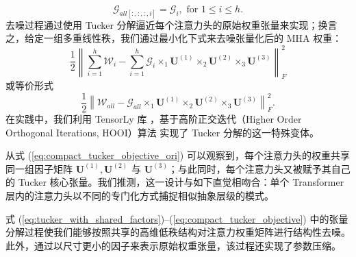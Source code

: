 \begin{equation}
    \mathcal{G}_{all [:,:,:,i]} = \mathcal{G}_i ,\text{ for  } 1\leq i \leq h.
    \label{eq:tucker_core_all}
\end{equation}
去噪过程通过使用 Tucker 分解逼近每个注意力头的原始权重张量来实现；换言之，给定一组多重线性秩，我们通过最小化下式来去噪张量化后的 MHA 权重：
\begin{equation}
\frac{1}{2} \left\| \sum_{i=1}^h \mathcal{W}_i - \sum_{i=1}^h \mathcal{G}_i \times_1 \mathbf{U}^{(1)} \times_2 \mathbf{U}^{(2)} \times_3 \mathbf{U}^{(3)} \right\|^2_F
\label{eq:compact_tucker_objective_ori}
\end{equation}
或等价形式
\begin{equation}
\frac{1}{2} \left\|\mathcal{W}_{all} - \mathcal{G}_{all} \times_1 \mathbf{U}^{(1)} \times_2 \mathbf{U}^{(2)} \times_3 \mathbf{U}^{(3)} \right\|^2_F.
\label{eq:compact_tucker_objective}
\end{equation}
在实践中，我们利用 TensorLy 库 \cite{tensorly}，基于高阶正交迭代（Higher Order Orthogonal Iterations, HOOI）算法 \cite{de2000best} 实现了 Tucker 分解的这一特殊变体。
\begin{rem}
从式 (\ref{eq:compact_tucker_objective_ori}) 可以观察到，每个注意力头的权重共享同一组因子矩阵 $\mathbf{U}^{(1)}, \mathbf{U}^{(2)}$ 与 $\mathbf{U}^{(3)}$；与此同时，每个注意力头又被赋予其自己的 Tucker 核心张量。我们推测，这一设计与如下直觉相吻合：单个 Transformer 层内的注意力头以不同的专门化方式捕捉相似抽象层级的模式。
\end{rem} 

\begin{rem}
式 (\ref{eq:tucker_with_shared_factors})--(\ref{eq:compact_tucker_objective}) 中的张量分解过程使我们能够按照共享的高维低秩结构对注意力权重矩阵进行结构性去噪。此外，通过以尺寸更小的因子来表示原始权重张量，该过程还实现了参数压缩。
\end{rem}



